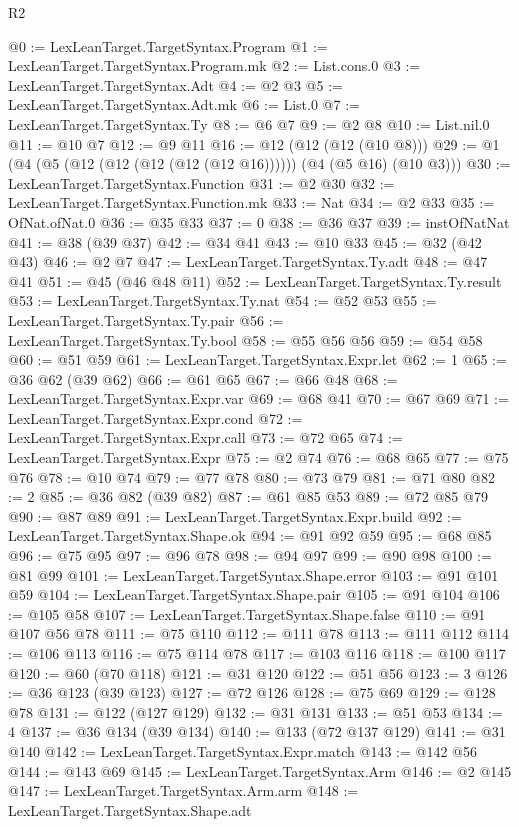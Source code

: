 \begin{lexlean}{R2}
\begin{coremodule}
{{{{{{{{{{{{{{{{{{{{{{{{{{{{{{{{{{{{{{{{{{{@0 := LexLeanTarget.TargetSyntax.Program
@1 := LexLeanTarget.TargetSyntax.Program.mk
@2 := List.cons.{0}
@3 := LexLeanTarget.TargetSyntax.Adt
@4 := @2 @3
@5 := LexLeanTarget.TargetSyntax.Adt.mk
@6 := List.{0}
@7 := LexLeanTarget.TargetSyntax.Ty
@8 := @6 @7
@9 := @2 @8
@10 := List.nil.{0}
@11 := @10 @7
@12 := @9 @11
@16 := @12 (@12 (@12 (@10 @8)))
@29 := @1 (@4 (@5 (@12 (@12 (@12 (@12 (@12 @16)))))) (@4 (@5 @16) (@10 @3)))
@30 := LexLeanTarget.TargetSyntax.Function
@31 := @2 @30
@32 := LexLeanTarget.TargetSyntax.Function.mk
@33 := Nat
@34 := @2 @33
@35 := OfNat.ofNat.{0}
@36 := @35 @33
@37 := 0
@38 := @36 @37
@39 := instOfNatNat
@41 := @38 (@39 @37)
@42 := @34 @41
@43 := @10 @33
@45 := @32 (@42 @43)
@46 := @2 @7
@47 := LexLeanTarget.TargetSyntax.Ty.adt
@48 := @47 @41
@51 := @45 (@46 @48 @11)
@52 := LexLeanTarget.TargetSyntax.Ty.result
@53 := LexLeanTarget.TargetSyntax.Ty.nat
@54 := @52 @53
@55 := LexLeanTarget.TargetSyntax.Ty.pair
@56 := LexLeanTarget.TargetSyntax.Ty.bool
@58 := @55 @56 @56
@59 := @54 @58
@60 := @51 @59
@61 := LexLeanTarget.TargetSyntax.Expr.let
@62 := 1
@65 := @36 @62 (@39 @62)
@66 := @61 @65
@67 := @66 @48
@68 := LexLeanTarget.TargetSyntax.Expr.var
@69 := @68 @41
@70 := @67 @69
@71 := LexLeanTarget.TargetSyntax.Expr.cond
@72 := LexLeanTarget.TargetSyntax.Expr.call
@73 := @72 @65
@74 := LexLeanTarget.TargetSyntax.Expr
@75 := @2 @74
@76 := @68 @65
@77 := @75 @76
@78 := @10 @74
@79 := @77 @78
@80 := @73 @79
@81 := @71 @80
@82 := 2
@85 := @36 @82 (@39 @82)
@87 := @61 @85 @53
@89 := @72 @85 @79
@90 := @87 @89
@91 := LexLeanTarget.TargetSyntax.Expr.build
@92 := LexLeanTarget.TargetSyntax.Shape.ok
@94 := @91 @92 @59
@95 := @68 @85
@96 := @75 @95
@97 := @96 @78
@98 := @94 @97
@99 := @90 @98
@100 := @81 @99
@101 := LexLeanTarget.TargetSyntax.Shape.error
@103 := @91 @101 @59
@104 := LexLeanTarget.TargetSyntax.Shape.pair
@105 := @91 @104
@106 := @105 @58
@107 := LexLeanTarget.TargetSyntax.Shape.false
@110 := @91 @107 @56 @78
@111 := @75 @110
@112 := @111 @78
@113 := @111 @112
@114 := @106 @113
@116 := @75 @114 @78
@117 := @103 @116
@118 := @100 @117
@120 := @60 (@70 @118)
@121 := @31 @120
@122 := @51 @56
@123 := 3
@126 := @36 @123 (@39 @123)
@127 := @72 @126
@128 := @75 @69
@129 := @128 @78
@131 := @122 (@127 @129)
@132 := @31 @131
@133 := @51 @53
@134 := 4
@137 := @36 @134 (@39 @134)
@140 := @133 (@72 @137 @129)
@141 := @31 @140
@142 := LexLeanTarget.TargetSyntax.Expr.match
@143 := @142 @56
@144 := @143 @69
@145 := LexLeanTarget.TargetSyntax.Arm
@146 := @2 @145
@147 := LexLeanTarget.TargetSyntax.Arm.arm
@148 := LexLeanTarget.TargetSyntax.Shape.adt
}}}}}}}}}}}}}}}}}}}}}}}}}}}}}}}}}}}}}}}}}}}
\end{coremodule}
\end{lexlean}
